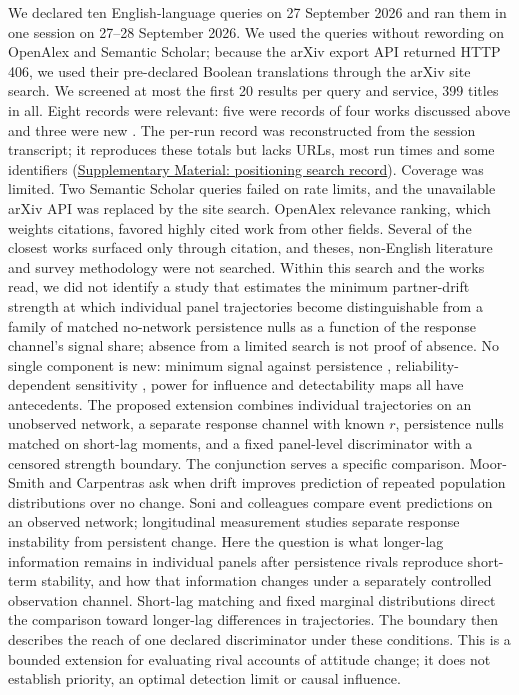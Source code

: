 We declared ten English-language queries on 27 September 2026 and ran them in one session on 27--28 September 2026. We used the queries without rewording on OpenAlex and Semantic Scholar; because the arXiv export API returned HTTP 406, we used their pre-declared Boolean translations through the arXiv site search. We screened at most the first 20 results per query and service, 399 titles in all. Eight records were relevant: five were records of four works discussed above and three were new \cite{carpentras2022,xu2021sensitivity,advani2018credibly}.
The per-run record was reconstructed from the session transcript; it reproduces these totals but lacks URLs, most run times and some identifiers (\hyperref[supp:search-record]{Supplementary Material: positioning search record}).
Coverage was limited. Two Semantic Scholar queries failed on rate limits, and the unavailable arXiv API was replaced by the site search. OpenAlex relevance ranking, which weights citations, favored highly cited work from other fields. Several of the closest works surfaced only through citation, and theses, non-English literature and survey methodology were not searched.
Within this search and the works read, we did not identify a study that estimates the minimum partner-drift strength at which individual panel trajectories become distinguishable from a family of matched no-network persistence nulls as a function of the response channel's signal share; absence from a limited search is not proof of absence.
No single component is new: minimum signal against persistence \cite{moor2026,coding2024}, reliability-dependent sensitivity \cite{mulder2023,dang2026}, power for influence \cite{stadtfeld2020} and detectability maps \cite{urena2026} all have antecedents. The proposed extension combines individual trajectories on an unobserved network, a separate response channel with known $r$, persistence nulls matched on short-lag moments, and a fixed panel-level discriminator with a censored strength boundary.
The conjunction serves a specific comparison. Moor-Smith and Carpentras ask when drift improves prediction of repeated population distributions over no change. Soni and colleagues compare event predictions on an observed network; longitudinal measurement studies separate response instability from persistent change. Here the question is what longer-lag information remains in individual panels after persistence rivals reproduce short-term stability, and how that information changes under a separately controlled observation channel. Short-lag matching and fixed marginal distributions direct the comparison toward longer-lag differences in trajectories. The boundary then describes the reach of one declared discriminator under these conditions. This is a bounded extension for evaluating rival accounts of attitude change; it does not establish priority, an optimal detection limit or causal influence.
